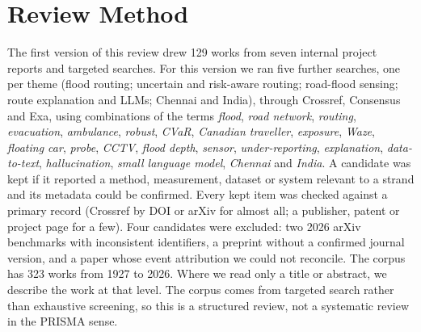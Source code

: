 \documentclass[journal]{IEEEtran}
\begin{document}
\section{Review Method}\label{sec:method}
The first version of this review drew 129 works from seven internal project reports and targeted searches. For this version we ran five further searches, one per theme (flood routing; uncertain and risk-aware routing; road-flood sensing; route explanation and LLMs; Chennai and India), through Crossref, Consensus and Exa, using combinations of the terms \emph{flood}, \emph{road network}, \emph{routing}, \emph{evacuation}, \emph{ambulance}, \emph{robust}, \emph{CVaR}, \emph{Canadian traveller}, \emph{exposure}, \emph{Waze}, \emph{floating car}, \emph{probe}, \emph{CCTV}, \emph{flood depth}, \emph{sensor}, \emph{under-reporting}, \emph{explanation}, \emph{data-to-text}, \emph{hallucination}, \emph{small language model}, \emph{Chennai} and \emph{India}. A candidate was kept if it reported a method, measurement, dataset or system relevant to a strand and its metadata could be confirmed. Every kept item was checked against a primary record (Crossref by DOI or arXiv for almost all; a publisher, patent or project page for a few). Four candidates were excluded: two 2026 arXiv benchmarks with inconsistent identifiers, a preprint without a confirmed journal version, and a paper whose event attribution we could not reconcile. The corpus has 323 works from 1927 to 2026. Where we read only a title or abstract, we describe the work at that level. The corpus comes from targeted search rather than exhaustive screening, so this is a structured review, not a systematic review in the PRISMA sense.
\end{document}
